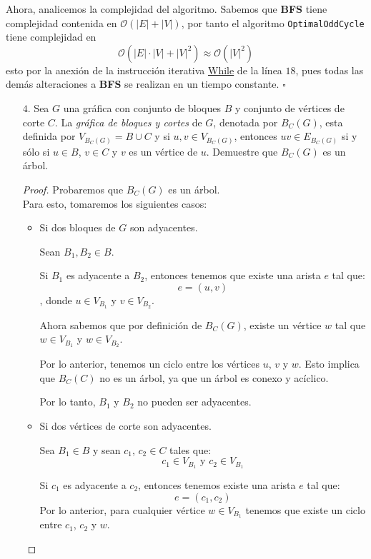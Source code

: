 \documentclass{article}
\newcommand{\code}[1]{\textcolor{white!25!black}{\texttt{#1}}}
\begin{document}
Ahora, analicemos la complejidad del algoritmo. Sabemos que \textbf{BFS}
tiene complejidad contenida en $\mathcal{O}(|E| + |V|)$, por tanto el
algoritmo \code{OptimalOddCycle} tiene complejidad en
\[
\mathcal{O}(|E|\cdot|V| + |V|^2) \approx \mathcal{O}(|V|^2)
\]
esto por la anexi\'on de la instrucci\'on iterativa \underline{While} de
la l\'inea $18$, pues todas las dem\'as alteraciones a \textbf{BFS} se
realizan en un tiempo constante.
\hfill $\square$
\begin{enumerate}
\item[$4$.] Sea $G$ una gr\'afica con conjunto de bloques $B$ y conjunto de
  v\'ertices de corte $C$.   La {\em gr\'afica de bloques y cortes} de $G$,
  denotada por $B_C (G)$, esta definida por $V_{B_C (G)} = B \cup C$ y
  si $u, v \in V_{B_C (G)}$, entonces $uv \in E_{B_C (G)}$ si y s\'olo si
  $u \in B$, $v \in C$ y $v$ es un v\'ertice de $u$.   Demuestre que
  $B_C (G)$ es un \'arbol.

  \begin{proof}
    Probaremos que $B_{C}(G)$ es un árbol. \\
    Para esto, tomaremos los siguientes casos:
    \begin{itemize}
      \item Si dos bloques de $G$ son adyacentes.

        Sean $B_{1}, B_{2} \in B$.

        Si $B_{1}$ es adyacente a $B_{2}$, entonces tenemos que existe una arista $e$ tal que:
        $$e = (u, v)$$
        , donde $u \in V_{B_{1}}$ y $v \in V_{B_{2}}$.

        Ahora sabemos que por definición de $B_{C}(G)$, existe un vértice $w$ tal que $w \in V_{B_{1}}$ y $w \in V_{B_{2}}$.

        Por lo anterior, tenemos un ciclo entre los vértices $u$, $v$ y $w$. Esto implica que $B_{C}(C)$ no es un árbol, ya que un árbol es conexo y acíclico.

        Por lo tanto, $B_{1}$ y $B_{2}$ no pueden ser adyacentes. \\

      \item Si dos vértices de corte son adyacentes.

        Sea $B_{1} \in B$ y sean $c_{1}$, $c_{2} \in C$ tales que:
        $$c_{1} \in V_{B_{1}} \text{ y } c_{2} \in V_{B_{1}}$$

        Si $c_{1}$ es adyacente a $c_{2}$, entonces tenemos existe una arista $e$ tal que:
        $$e = (c_{1}, c_{2})$$
        Por lo anterior, para cualquier vértice $w \in V_{B_{1}}$ tenemos que existe un ciclo entre $c_{1}$, $c_{2}$ y $w$.


\end{itemize}
\end{proof}
\end{enumerate}
\end{document}
